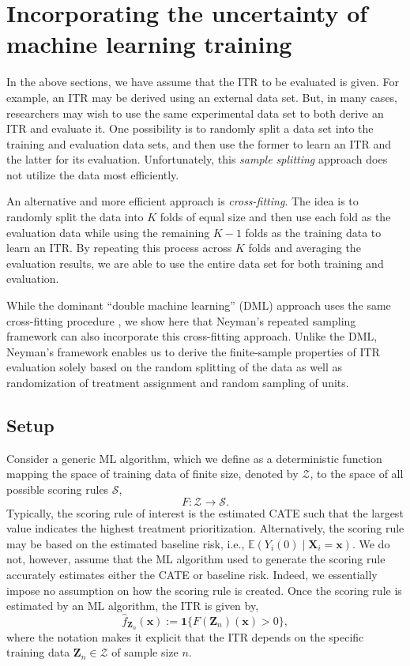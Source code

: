 \documentclass[USenglish,onecolumn]{article}
\newcommand\cZ{\mathcal{Z}}
\newcommand\E{\mathbb{E}}
\newcommand\cS{\mathcal{S}}
\newcommand\bx{\bm{x}}
\newcommand\bX{\bm{X}}
\newcommand\bZ{\bm{Z}}
\begin{document}
\section{Incorporating the uncertainty of machine learning training}
\label{sec:cross-validation}

In the above sections, we have assume that the ITR to be evaluated is
given.  For example, an ITR may be derived using an external data set.
But, in many cases, researchers may wish to use the same experimental
data set to both derive an ITR and evaluate it.  One possibility is to
randomly split a data set into the training and evaluation data sets,
and then use the former to learn an ITR and the latter for its
evaluation.  Unfortunately, this {\it sample splitting} approach does
not utilize the data most efficiently.

An alternative and more efficient approach is {\it cross-fitting}.
The idea is to randomly split the data into $K$ folds of equal size
and then use each fold as the evaluation data while using the
remaining $K-1$ folds as the training data to learn an ITR.  By
repeating this process across $K$ folds and averaging the evaluation
results, we are able to use the entire data set for both training and
evaluation.

While the dominant ``double machine learning'' (DML) approach uses the
same cross-fitting procedure \citep{chernozhukov2018double}, we show
here that Neyman's repeated sampling framework can also incorporate
this cross-fitting approach.  Unlike the DML, Neyman's framework
enables us to derive the finite-sample properties of ITR evaluation
solely based on the random splitting of the data as well as
randomization of treatment assignment and random sampling of units.

\subsection{Setup}

Consider a generic ML algorithm, which we define as
a deterministic function mapping the space of training data of finite
size, denoted by $\cZ$, to the space of all possible scoring rules
$\cS$,
\begin{equation}
  F: \cZ \to \cS.
\end{equation}
Typically, the scoring rule of interest is the estimated CATE such
that the largest value indicates the highest treatment prioritization.
Alternatively, the scoring rule may be based on the estimated baseline
risk, i.e., $\E(Y_i(0) \mid \bX_i = \bx)$.  We do not, however, assume
that the ML algorithm used to generate the scoring rule accurately
estimates either the CATE or baseline risk.  Indeed, we essentially
impose no assumption on how the scoring rule is created.  Once the
scoring rule is estimated by an ML algorithm, the ITR is given by,
\begin{equation}
  \hat{f}_{\bZ_n}(\bx):=\mathbf{1}\{F(\bZ_n)(\bx)>0\}, \label{eq:f.hat}
\end{equation}
where the notation makes it explicit that the ITR depends on the
specific training data $\bZ_n \in \cZ$ of sample size $n$.
\end{document}
